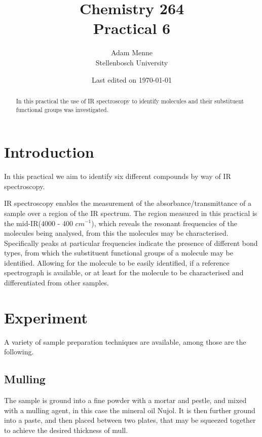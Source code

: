 \documentclass[a4paper, british]{article}
\title{Chemistry 264\\ Practical 6}
\date{Last edited on \today}
\author{Adam Menne\\ Stellenbosch University}
\begin{document}
\maketitle

\begin{abstract}
\noindent
In this practical the use of IR spectroscopy to identify molecules and their substituent functional groups was investigated.
\end{abstract}

\tableofcontents

\newpage

\section{Introduction}

In this practical we aim to identify six different compounds by way of IR spectroscopy.

IR spectroscopy enables the measurement of the absorbance/transmittance of a sample over a region of the IR spectrum. The region measured in this practical is the mid-IR(4000 - 400 \(cm^{-1}\)), which reveals the resonant frequencies of the molecules being analysed, from this the molecules may be characterised. Specifically peaks at particular frequencies indicate the presence of different bond types, from which the substituent functional groups of a molecule may be identified. Allowing for the molecule to be easily identified, if a reference spectrograph is available, or at least for the molecule to be characterised and differentiated from other samples. 


\section{Experiment}

A variety of sample preparation techniques are available, among those are the following.

\subsection*{Mulling}

The sample is ground into a fine powder with a mortar and pestle, and mixed with a mulling agent, in this case the mineral oil Nujol. It is then further ground into a paste, and then placed between two plates, that may be squeezed together to achieve the desired thickness of mull. \cite{harwoodExperimentalOrganicChemistry1990}
\end{document}
